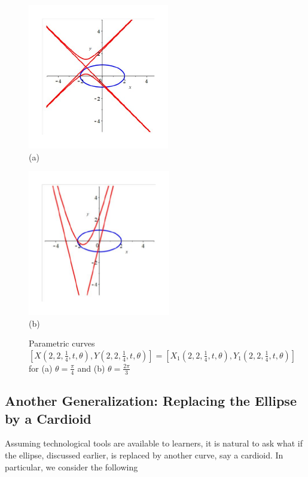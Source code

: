 \documentclass[12pt,a4paper]{article}%
\begin{document}
\begin{figure}[htpb]
\begin{center}
\parbox[b]{2.5in}{\begin{center}
\includegraphics[height=2.5in,keepaspectratio]{PJH75I1O.pdf}
 \\ (a)
\end{center}}
\qquad
\parbox[b]{2.5in}{\begin{center}
\includegraphics[height=2.5in,keepaspectratio]{PJH75I1P.pdf}
 \\ (b)
\end{center}}
\end{center}
\caption{Parametric curves $[X(2,2,\frac{1}{4},t,\theta), Y(2,2,\frac{1}{4},t,\theta)] 
                                          = [X_1(2,2,\frac{1}{4},t,\theta), Y_1(2,2,\frac{1}{4},t,\theta)]$
              for (a) $\theta=\frac{\pi}{4}$ and (b) $\theta=\frac{2\pi}{3}$}
\label{fig12}
\end{figure}

\subsection{Another Generalization: Replacing the Ellipse by a Cardioid} \label{ssec4-1}

Assuming technological tools are available to learners, it is natural to ask
what if the ellipse, discussed earlier, is replaced by another curve, say a
cardioid. In particular, we consider the following
\end{document}
